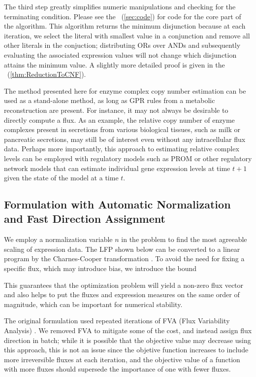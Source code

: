 The third step greatly simplifies numeric manipulations and checking
for the terminating condition. Please see the
\suppOrApp~(\ref{sec:code}) for code for the core part of the
algorithm. This algorithm returns the minimum disjunction because at
each iteration, we select the literal with smallest value in a
conjunction and remove all other literals in the conjuction;
distributing ORs over ANDs and subsequently evaluating the associated
expression values will not change which disjunction attains the
minimum value. A slightly more detailed proof is given in the
\suppOrApp~(\ref{thm:ReductionToCNF}).

The method presented here for enzyme complex copy number estimation
can be used as a stand-alone method, as long as GPR rules from a
metabolic reconstruction are present. For instance, it may not always
be desirable to directly compute a flux. As an example, the relative
copy number of enzyme complexes present in secretions from various
biological tissues, such as milk or pancreatic secretions, may still
be of interest even without any intracellular flux data.  Perhaps more
importantly, this approach to estimating relative complex levels can
be employed with regulatory models such as PROM
\citep{Chandrasekaran2010a} or other regulatory network models that
can estimate individual gene expression levels at time $t+1$ given the
state of the model at a time $t$.

\subsection{Formulation with Automatic Normalization and Fast Direction Assignment}
We employ a normalization variable $n$ in the problem
to find the most agreeable scaling of expression data. The
LFP shown below can be converted to a linear program by the Charnes-Cooper transformation
 \citep{Boyd2004}.
To avoid the need for fixing a specific flux, which may introduce bias,
we introduce the bound

This guarantees that the
optimization problem will yield a non-zero flux vector and also helps
to put the fluxes and expression measures on the same order of
magnitude, which can be important for numerical stability.

The original formulation used repeated iterations of FVA (Flux Variability Analysis)
\citep{Lee2012}. We removed FVA to mitigate some of the cost, and instead 
assign flux direction in batch; while it is possible that the objective value
may decrease using this approach, this is not an issue since the objetive
function increases to include more irreversible fluxes at each iteration,
and the objective value of a function with more fluxes should supersede
the importance of one with fewer fluxes.
 
